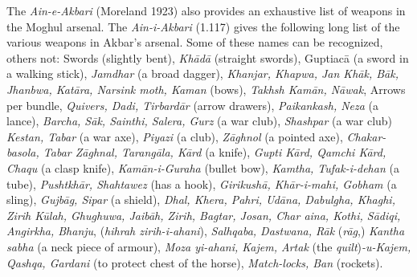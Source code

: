 The {\it Ain-e-Akbari} (Moreland 1923) also provides an exhaustive list of weapons in the Moghul arsenal. The {\it Ain-i-Akbari} (1.117) gives the following long list of the various weapons in Akbar's arsenal. Some of these names can be recognized, others not: Swords (slightly bent), {\it Khādā} (straight swords), Guptiacā (a sword in a walking stick), {\it Jamdhar} (a broad dagger), {\it Khanjar, Khapwa, Jan Khāk, Bāk, Jhanbwa, Katāra, Narsink moth, Kaman} (bows), {\it Takhsh Kamān, Nāwak}, Arrows per bundle, {\it Quivers, Dadi, Tirbardār} (arrow drawers), {\it Paikankash, Neza} (a lance), {\it Barcha, Sāk, Sainthi, Salera, Gurz} (a war club), {\it Shashpar} (a war club) {\it Kestan, Tabar} (a war axe), {\it Piyazi} (a club), {\it Zāghnol} (a pointed axe), {\it Chakar-basola, Tabar Zāghnal, Tarangāla, Kārd} (a knife), {\it Gupti Kārd, Qamchi Kārd, Chaqu} (a clasp knife), {\it Kamān-i-Guraha} (bullet bow), {\it Kamtha, Tufak-i-dehan} (a tube), {\it Pushtkhār, Shahtawez} (has a hook), {\it Girikushā, Khār-i-mahi, Gobham} (a sling), {\it Gujbāg, Sipar} (a shield), {\it Dhal, Khera, Pahri, Udāna, Dabulgha, Khaghi, Zirih Kūlah, Ghughuwa, Jaibāh, Zirih, Bagtar, Josan, Char aina, Kothi, Sādiqi, Angirkha, Bhanju}, ({\it hihrah zirih-i­-ahani}), {\it Salhqaba, Dastwana, Rāk} ({\it rāg},) {\it Kantha sabha} (a neck piece of armour), {\it Moza yi-ahani, Kajem, Artak} (the {\it quilt}){\it -u-Kajem, Qashqa, Gardani} (to protect chest of the horse), {\it Match-locks, Ban} (rockets).

